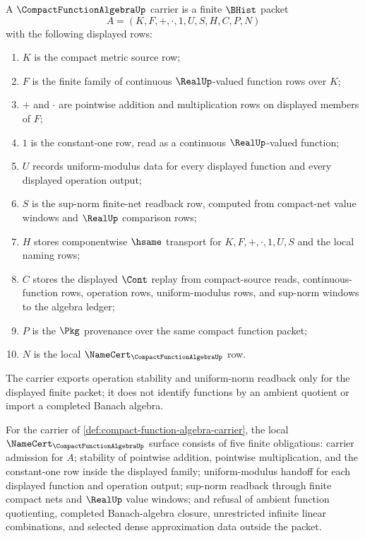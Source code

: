 \begin{definition}
\label{def:compact-function-algebra-carrier}
A $\CompactFunctionAlgebraUp$ carrier is a finite $\BHist$ packet
$$
A=(K,F,+,\cdot,1,U,S,H,C,P,N)
$$
with the following displayed rows:
\begin{enumerate}
\item $K$ is the compact metric source row;
\item $F$ is the finite family of continuous $\RealUp$-valued function rows over $K$;
\item $+$ and $\cdot$ are pointwise addition and multiplication rows on displayed members of $F$;
\item $1$ is the constant-one row, read as a continuous $\RealUp$-valued function;
\item $U$ records uniform-modulus data for every displayed function and every displayed operation output;
\item $S$ is the sup-norm finite-net readback row, computed from compact-net value windows and $\RealUp$ comparison rows;
\item $H$ stores componentwise $\hsame$ transport for $K,F,+,\cdot,1,U,S$ and the local naming rows;
\item $C$ stores the displayed $\Cont$ replay from compact-source reads, continuous-function rows, operation rows, uniform-modulus rows, and sup-norm windows to the algebra ledger;
\item $P$ is the $\Pkg$ provenance over the same compact function packet;
\item $N$ is the local $\NameCert_{\CompactFunctionAlgebraUp}$ row.
\end{enumerate}
The carrier exports operation stability and uniform-norm readback only for the displayed finite packet; it does not identify functions by an ambient quotient or import a completed Banach algebra.
\end{definition}

\begin{theorem}
\label{thm:compact-function-algebra-namecert-obligations}
For the carrier of \autoref{def:compact-function-algebra-carrier}, the local $\NameCert_{\CompactFunctionAlgebraUp}$ surface consists of five finite obligations: carrier admission for $A$; stability of pointwise addition, pointwise multiplication, and the constant-one row inside the displayed family; uniform-modulus handoff for each displayed function and operation output; sup-norm readback through finite compact nets and $\RealUp$ value windows; and refusal of ambient function quotienting, completed Banach-algebra closure, unrestricted infinite linear combinations, and selected dense approximation data outside the packet.
\end{theorem}

